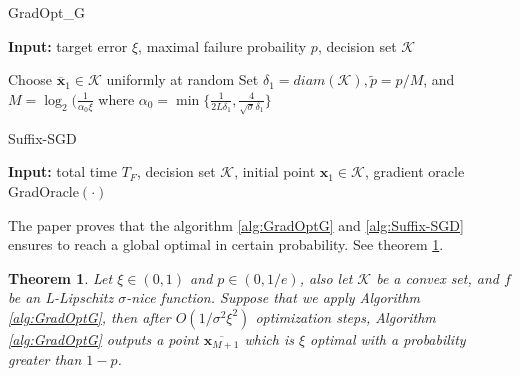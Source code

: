 \begin{algorithm}
\caption{GradOpt_G}
\label{alg:GradOptG}
{\bfseries Input:} target error $\xi$, maximal failure probaility $p$, decision set $\mathcal{K}$
\begin{algorithmic}[1]
\State Choose $\overline{\mathbf{x}}_1 \in \mathcal{K}$ uniformly at random
\State Set $\delta_1 = diam(\mathcal{K}), \tilde{p} = p/M$, and $M = \log_2(\frac{1}{\alpha_0\xi}$ where $\alpha_0=\min\big\{\frac{1}{2L\delta_1}, \frac{4}{\sqrt{\sigma}\delta_1}\big\}$  
\EndFor
\State {}
\end{algorithmic}
\end{algorithm}

\begin{algorithm}
\caption{Suffix-SGD}
\label{alg:Suffix-SGD}
{\bfseries Input:} total time $T_F$, decision set $\mathcal{K}$, initial point $\mathbf{x}_1 \in \mathcal{K}$, gradient oracle GradOracle$(\cdot)$
\begin{algorithmic}[1]
\EndFor
\State {} 
\end{algorithmic}
\end{algorithm}

The paper proves that the algorithm \ref{alg:GradOptG} and \ref{alg:Suffix-SGD} ensures to reach a global optimal in certain probability. See theorem \ref{theorem:GradOptG}.
\newtheorem{theorem:GradOptG}{Theorem}
\begin{theorem:GradOptG}
\label{theorem:GradOptG}
Let $\xi \in (0,1)$ and $p \in (0, 1/e)$, also let $\mathcal{K}$ be a convex set, and $f$ be an L-Lipschitz $\sigma$-nice function. Suppose that we apply Algorithm \ref{alg:GradOptG}, then after $O(1/\sigma^2\xi^2)$ optimization steps, Algorithm \ref{alg:GradOptG} outputs a point $\overline{\mathbf{x}_{M+1}}$ which is $\xi$ optimal with a probability greater than $1-p$.
\end{theorem:GradOptG}

